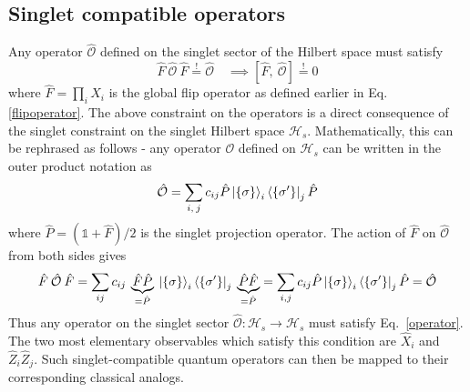 \documentclass[../thesis_main.tex]{subfiles}
\begin{document}
\subsection{Singlet compatible operators}
Any operator $\hat{\mathcal{O}}$ defined on the singlet sector of the Hilbert space must satisfy 
\begin{equation}
    \hat{F} \: \hat{\mathcal{O}} \: \hat{F} \stackrel{!}{=} \hat{\mathcal{O}} \quad \implies [\hat{F}, \: \hat{\mathcal{O}}] \stackrel{!}{=} 0
    \label{operator}
\end{equation}
where $\hat{F} = \prod_i \hat{X}_i$ is the global flip operator as defined earlier in Eq. \ref{flipoperator}. The above constraint on the operators is a direct consequence of the singlet constraint on the singlet Hilbert space $\mathcal{H}_s$. Mathematically, this can be rephrased as follows - any operator $\mathcal{O}$ defined on $\mathcal{H}_s$ can be written in the outer product notation as 
\begin{equation}
    \hat{\mathcal{O}} = \sum_{i,\:j} c_{ij} \hat{P}\ket{\{\sigma\}}_i \bra{\{\sigma '\}}_j \hat{P}
\end{equation}
where $\hat{P} = (\mathds{1} + \hat{F})/2$ is the singlet projection operator. The action of $\hat{F}$ on $\hat{\mathcal{O}}$ from both sides gives   
\begin{equation}
    \hat{F} \: \hat{\mathcal{O}} \: \hat{F} = \sum_{ij} c_{ij} \: \underbrace{\hat{F}\hat{P}}_{ = \hat{P}} \: \ket{\{\sigma\}}_i \bra{\{\sigma '\}}_j \:\underbrace{\hat{P} \hat{F}}_{ = \hat{P}} = \sum_{i,j} c_{ij} \hat{P}\ket{\{\sigma\}}_i \bra{\{\sigma '\}}_j \hat{P} = \hat{\mathcal{O}}
\end{equation}
Thus any operator on the singlet sector $\hat{\mathcal{O}}: \mathcal{H}_s \to \mathcal{H}_s$ must satisfy  Eq.~\eqref{operator}. The two most elementary observables which satisfy this condition are $\hat{X}_i$ and $\hat{Z}_i \hat{Z}_j$.   Such singlet-compatible quantum operators can then be mapped to their corresponding classical analogs.  
\end{document}
